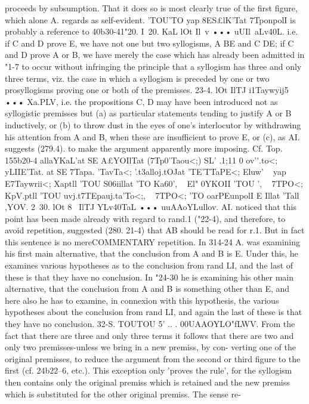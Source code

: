 {{{{{{{{{{{{{{{proceeds by subsumption. That it does so is most clearly true
of the first figure, which alone A. regards as self-evident. 'TOU'TO yap
8ES£lK'Tat 7TponpolI is probably a reference to 40b30-41"20.
I~20. KaL lOt Il~v ••• uUIl~aLv40L. i.e. if C and D prove E, we
have not one but two syllogisms, A BE and C DE; if C and D
prove A or B, we have merely the case which has already been
admitted in "1-7 to occur without infringing the principle that
a syllogism has three and only three terms, viz. the case in which
a syllogism is preceded by one or two prosyllogisms proving one
or both of the premisses.
23-4. lOt IlTJ i1Taywyij5 ••• Xa.PLV, i.e. the propositions C, D
may have been introduced not as syllogistic premisses but (a) as
particular statements tending to justify A or B inductively, or
(b) to throw dust in the eyes of one's interlocutor by withdrawing
his attention from A and B, when these are insufficient to prove
E, or (c), as AI. suggests (279.4). to make the argument apparently
more imposing. Cf. Top. 155b20-4 allaYKaL'at SE A£YOIlTat (7Tp0'Taou<;)
SL' .1;11 0 ov'\'\oytuj.to<; yLIIE'Tat. at SE 7Tapa. 'TavTa<; '\aj.t{3alloj.tOJat
'TE'TTaPE<; Eluw' ~ yap E7Taywrii<; Xaptll 'TOU S06iillat 'TO Ka60'\ov, ~ El"
0YKOII 'TOU '\oyov, ~ 7TPO<; KpV.ptll 'TOU uvj.t7TEpauj.ta'To<;, ~ 7TPO<; 'TO
oarPEunpolI E Illat 'Tall ,\0YOV.
2~30. lOt 8~ IlTJ YLv40TaL ••• uuAAoYLullov. AI. noticed that this
point has been made already with regard to rand.1 ("22-4),
and therefore, to avoid repetition, suggested (280. 21-4) that AB
should be read for r.1. But in fact this sentence is no mereCOMMENTARY
repetition. In 314-24 A. was examining his first main alternative,
that the conclusion from A and B is E. Under this, he examines
various hypotheses as to the conclusion from rand LI, and the
last of these is that they have no conclusion. In "24-30 he is
examining his other main alternative, that the conclusion from A
and B is something other than E, and here also he has to examine,
in connexion with this hypothesis, the various hypotheses about
the conclusion from rand LI, and again the last of these is that
they have no conclusion.
32-S. TOUTOU 5' .. . 00UAAOYLO"fLWV. From the fact that there
are three and only three terms it follows that there are two and
only two premisses-unless we bring in a new premiss, by con-
verting one of the original premisses, to reduce the argument
from the second or third figure to the first (cf. 24b22--6, etc.). This
exception only 'proves the rule', for the syllogism then contains
only the original premiss which is retained and the new premiss
which is substituted for the other original premiss. The sense re-
}}}}}}}}}}}}}}}}
